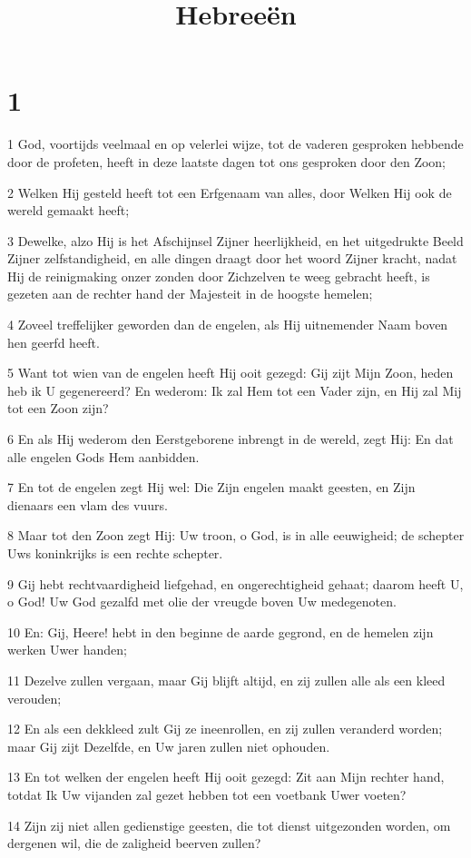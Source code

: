 

\title{Hebreeën}



\chapter{1}

\par 1 God, voortijds veelmaal en op velerlei wijze, tot de vaderen gesproken hebbende door de profeten, heeft in deze laatste dagen tot ons gesproken door den Zoon;
\par 2 Welken Hij gesteld heeft tot een Erfgenaam van alles, door Welken Hij ook de wereld gemaakt heeft;
\par 3 Dewelke, alzo Hij is het Afschijnsel Zijner heerlijkheid, en het uitgedrukte Beeld Zijner zelfstandigheid, en alle dingen draagt door het woord Zijner kracht, nadat Hij de reinigmaking onzer zonden door Zichzelven te weeg gebracht heeft, is gezeten aan de rechter hand der Majesteit in de hoogste hemelen;
\par 4 Zoveel treffelijker geworden dan de engelen, als Hij uitnemender Naam boven hen geerfd heeft.
\par 5 Want tot wien van de engelen heeft Hij ooit gezegd: Gij zijt Mijn Zoon, heden heb ik U gegenereerd? En wederom: Ik zal Hem tot een Vader zijn, en Hij zal Mij tot een Zoon zijn?
\par 6 En als Hij wederom den Eerstgeborene inbrengt in de wereld, zegt Hij: En dat alle engelen Gods Hem aanbidden.
\par 7 En tot de engelen zegt Hij wel: Die Zijn engelen maakt geesten, en Zijn dienaars een vlam des vuurs.
\par 8 Maar tot den Zoon zegt Hij: Uw troon, o God, is in alle eeuwigheid; de schepter Uws koninkrijks is een rechte schepter.
\par 9 Gij hebt rechtvaardigheid liefgehad, en ongerechtigheid gehaat; daarom heeft U, o God! Uw God gezalfd met olie der vreugde boven Uw medegenoten.
\par 10 En: Gij, Heere! hebt in den beginne de aarde gegrond, en de hemelen zijn werken Uwer handen;
\par 11 Dezelve zullen vergaan, maar Gij blijft altijd, en zij zullen alle als een kleed verouden;
\par 12 En als een dekkleed zult Gij ze ineenrollen, en zij zullen veranderd worden; maar Gij zijt Dezelfde, en Uw jaren zullen niet ophouden.
\par 13 En tot welken der engelen heeft Hij ooit gezegd: Zit aan Mijn rechter hand, totdat Ik Uw vijanden zal gezet hebben tot een voetbank Uwer voeten?
\par 14 Zijn zij niet allen gedienstige geesten, die tot dienst uitgezonden worden, om dergenen wil, die de zaligheid beerven zullen?


